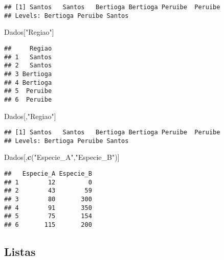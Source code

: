 \documentclass[
]{book}
\newenvironment{Shaded}{\begin{snugshade}}{\end{snugshade}}
\newcommand{\KeywordTok}[1]{\textcolor[rgb]{0.13,0.29,0.53}{\textbf{#1}}}
\newcommand{\NormalTok}[1]{#1}
\newcommand{\OperatorTok}[1]{\textcolor[rgb]{0.81,0.36,0.00}{\textbf{#1}}}
\newcommand{\StringTok}[1]{\textcolor[rgb]{0.31,0.60,0.02}{#1}}
\begin{document}
\begin{Shaded}
\end{Shaded}

\begin{verbatim}
## [1] Santos   Santos   Bertioga Bertioga Peruibe  Peruibe 
## Levels: Bertioga Peruibe Santos
\end{verbatim}

\begin{Shaded}
\begin{Highlighting}[]
\NormalTok{Dados[}\StringTok{"Regiao"}\NormalTok{]}
\end{Highlighting}
\end{Shaded}

\begin{verbatim}
##     Regiao
## 1   Santos
## 2   Santos
## 3 Bertioga
## 4 Bertioga
## 5  Peruibe
## 6  Peruibe
\end{verbatim}

\begin{Shaded}
\begin{Highlighting}[]
\NormalTok{Dados[,}\StringTok{"Regiao"}\NormalTok{]}
\end{Highlighting}
\end{Shaded}

\begin{verbatim}
## [1] Santos   Santos   Bertioga Bertioga Peruibe  Peruibe 
## Levels: Bertioga Peruibe Santos
\end{verbatim}

\begin{Shaded}
\begin{Highlighting}[]
\NormalTok{Dados[,}\KeywordTok{c}\NormalTok{(}\StringTok{"Especie_A"}\NormalTok{,}\StringTok{"Especie_B"}\NormalTok{)]}
\end{Highlighting}
\end{Shaded}

\begin{verbatim}
##   Especie_A Especie_B
## 1        12         0
## 2        43        59
## 3        80       300
## 4        91       350
## 5        75       154
## 6       115       200
\end{verbatim}

\hypertarget{listas}{%
\subsection{Listas}\label{listas}}
\end{document}
